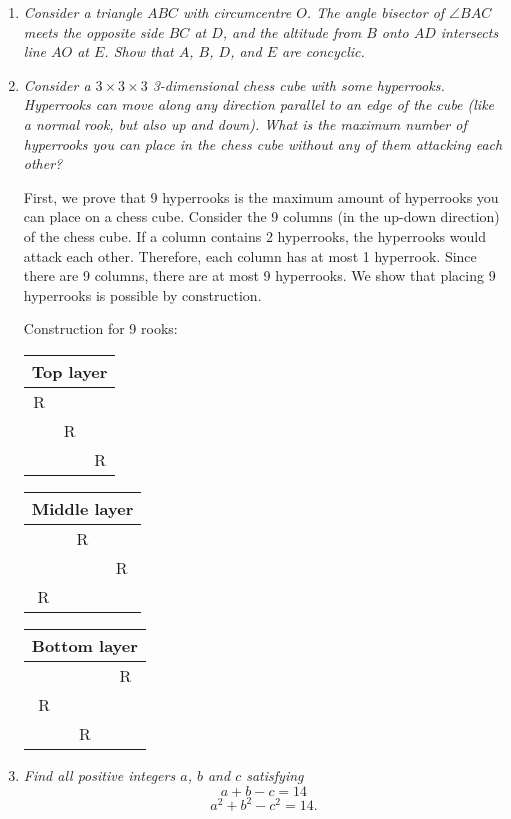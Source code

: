 \documentclass{article}
\begin{document}
\begin{enumerate}[1.]
\item %
{\itshape Consider a triangle $ABC$ with circumcentre $O$.
The angle bisector of $\angle BAC$ meets the opposite side $BC$ at $D$, and the altitude from $B$ onto $AD$ intersects line $AO$ at $E$.
Show that $A$, $B$, $D$, and $E$ are concyclic.}


\item %
{\itshape Consider a $3\times3\times3$ 3-dimensional chess cube with some hyperrooks.
Hyperrooks can move along any direction parallel to an edge of the cube (like a normal rook, but also up and down).
What is the maximum number of hyperrooks you can place in the chess cube without any of them attacking each other?}

First, we prove that 9 hyperrooks is the maximum amount of hyperrooks you can place on a chess cube. Consider the 9 columns (in the up-down direction) of the chess cube. If a column contains 2 hyperrooks, the hyperrooks would attack each other. Therefore, each column has at most 1 hyperrook. Since there are 9 columns, there are at most 9 hyperrooks. We show that placing 9 hyperrooks is possible by construction.

Construction for 9 rooks:
\begin{table}[h]
\centering
\begin{tabular}{| c | c| c |}
\multicolumn{3}{c}{Top layer}\\
\hline
R& &\\
\hline
&R&\\
\hline
&&R\\
\hline
\end{tabular}
\quad
\begin{tabular}{| c | c| c |}
\multicolumn{3}{c}{Middle layer}\\
\hline
&R &\\
\hline
&&R\\
\hline
R&&\\
\hline
\end{tabular}
\quad
\begin{tabular}{| c | c| c |}
\multicolumn{3}{c}{Bottom layer}\\
\hline
& &R\\
\hline
R&&\\
\hline
&R&\\
\hline
\end{tabular}
\end{table}

\item %
{\itshape Find all positive integers $a$, $b$ and $c$ satisfying 
$$a + b - c = 14$$
$$a^2 + b^2 - c^2 = 14.$$}


\end{enumerate}
\end{document}

